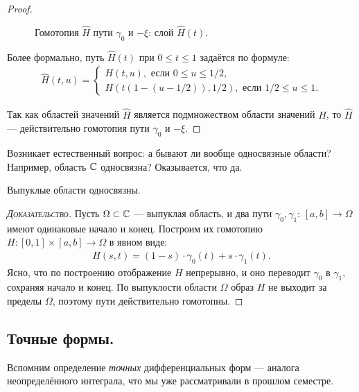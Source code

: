 \documentclass[../complex-analysis.tex]{subfiles}
\begin{document}
\begin{proof}
 \begin{figure}[ht]
  \centering
  \caption{Гомотопия $ \hat H $ пути $ \gamma_0 $ и $ -\xi $: слой $ \hat H(t) $.}
  \label{fig:homotopy_to_central_path}
 \end{figure}

 Более формально, путь $ \hat H(t) $ при $0 \leqslant t \leqslant 1$ задаётся по формуле:
 \begin{align*}
  \hat H(t, u) = \begin{cases}
   H(t, u), \text{ если } 0 \leqslant u \leqslant 1 / 2, \\
   H(t(1 - (u - 1 / 2)), 1 / 2), \text{ если } 1 / 2 \leqslant u \leqslant 1.
  \end{cases} 
 \end{align*}

 Так как областей значений $ \hat H $ является подмножеством области значений $ H$, то $ \hat H $ --- действительно гомотопия пути $ \gamma_0 $ и $ -\xi $.

\end{proof}

Возникает естественный вопрос: а бывают ли вообще односвязные области? Например, область $ \mathbb{C} $ односвязна? Оказывается, что да.

\begin{prop}
 Выпуклые области односвязны.
\end{prop}
\begin{proof}[\normalfont\textsc{Доказательство}]
 Пусть $ \Omega \subset \mathbb{C} $ --- выпуклая область, и два пути $ \gamma_0,\gamma_1\colon\,[a,b] \to \Omega $ имеют одинаковые начало и конец. Построим их гомотопию $ H \colon[0,1] \times [a,b]\to\Omega $ в явном виде:
 \begin{align*}
  H(s,t) = (1 - s) \cdot \gamma_0(t) + s \cdot \gamma_1(t).
 \end{align*} Ясно, что по построению отображение $ H $ непрерывно, и оно переводит $ \gamma_0 $ в $ \gamma_1 $, сохраняя начало и конец. По выпуклости области $ \Omega $ образ $ H $ не выходит за пределы $ \Omega $, поэтому пути действительно гомотопны.
\end{proof}

\subsection{Точные формы.}

Вспомним определение \textit{точных} дифференциальных форм --- аналога неопределённого интеграла, что мы уже рассматривали в прошлом семестре.
\end{document}
